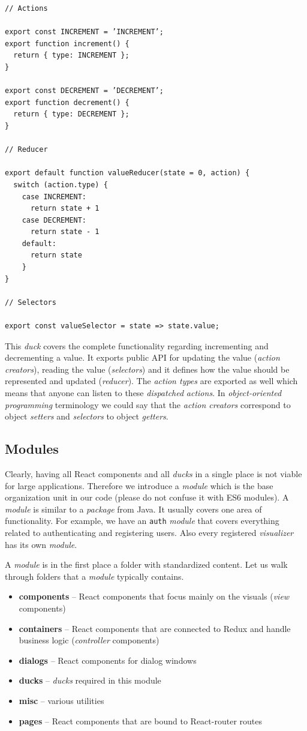 \begin{verbatim}
// Actions 

export const INCREMENT = ’INCREMENT’;
export function increment() {
  return { type: INCREMENT };
}

export const DECREMENT = ’DECREMENT’;
export function decrement() {
  return { type: DECREMENT };
}

// Reducer

export default function valueReducer(state = 0, action) {
  switch (action.type) {
    case INCREMENT:
      return state + 1
    case DECREMENT:
      return state - 1
    default:
      return state
    }
}

// Selectors

export const valueSelector = state => state.value;
\end{verbatim}

This \emph{duck} covers the complete functionality regarding incrementing and decrementing a value. It exports public API for updating the value (\emph{action creators}), reading the value (\emph{selectors}) and it defines how the value should be represented and updated (\emph{reducer}). The \emph{action types} are exported as well which means that anyone can listen to these \emph{dispatched} \emph{actions}. In \emph{object-oriented programming} terminology we could say that the \emph{action creators} correspond to object \emph{setters} and \emph{selectors} to object \emph{getters}.

\subsection{Modules}

Clearly, having all React components and all \emph{ducks} in a single place is not viable for large applications. Therefore we introduce a \emph{module} which is the base organization unit in our code (please do not confuse it with ES6 modules). A \emph{module} is similar to a \emph{package} from Java. It usually covers one area of functionality. For example, we have an \texttt{auth} \emph{module} that covers everything related to authenticating and registering users. Also every registered \emph{visualizer} has its own \emph{module}.

A \emph{module} is in the first place a folder with standardized content. Let us walk through folders that a \emph{module} typically contains.

\begin{itemize}
\item \textbf{components} -- React components that focus mainly on the visuals (\emph{view} components)
\item \textbf{containers} -- React components that are connected to Redux and handle business logic (\emph{controller} components)
\item \textbf{dialogs} -- React components for dialog windows
\item \textbf{ducks} -- \emph{ducks} required in this module
\item \textbf{misc} -- various utilities
\item \textbf{pages} -- React components that are bound to React-router routes
\end{itemize}

